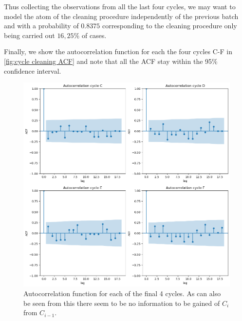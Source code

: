 \documentclass[../Thesis.tex]{subfiles}
\begin{document}
Thus collecting the observations from all the last four cycles, we may want to model the atom of the cleaning procedure independently of the previous batch and with a probability of $0.8375$ corresponding to the cleaning procedure only being carried out $16,25$\% of cases.

Finally, we show the autocorrelation function for each the four cycles C-F in \autoref{fig:cycle cleaning ACF} and note that all the ACF stay within the 95\% confidence interval.

\begin{figure}[h]
    \centering
    \includegraphics[width=0.8\linewidth]{figures/Multiple cycles data/Cleaning Autocorrelation.png}
    \caption{Autocorrelation function for each of the final 4 cycles. As can also be seen from this there seem to be no information to be gained of $C_i$ from $C_{i-1}$.}
    \label{fig:cycle cleaning ACF}
\end{figure}
\end{document}
